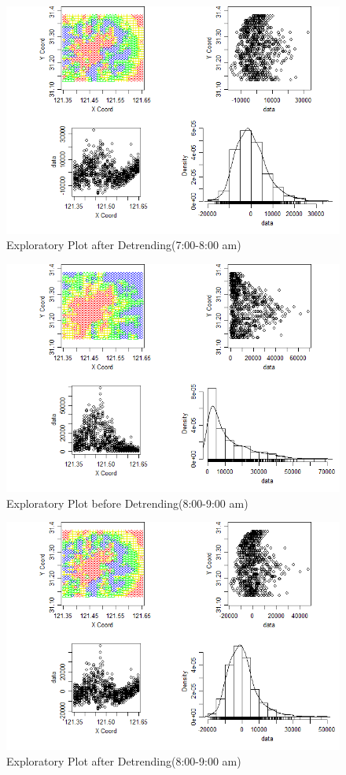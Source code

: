\documentclass[hidelinks,12pt]{article}
\begin{document}
\FloatBarrier
\begin{figure}[!ht]
	\includegraphics[width=\textwidth]{gres7.png}
	\caption{Exploratory Plot after Detrending(7:00-8:00 am)\label{fig:gres7}}
\end{figure}
\FloatBarrier
\begin{figure}[!ht]
	\includegraphics[width=\textwidth]{geo8.png}
	\caption{Exploratory Plot before Detrending(8:00-9:00 am) \label{fig:geo8}}
\end{figure}
\FloatBarrier
\begin{figure}[!ht]
	\includegraphics[width=\textwidth]{gres8.png}
	\caption{Exploratory Plot after Detrending(8:00-9:00 am)\label{fig:gres8}}
\end{figure}
\end{document}
